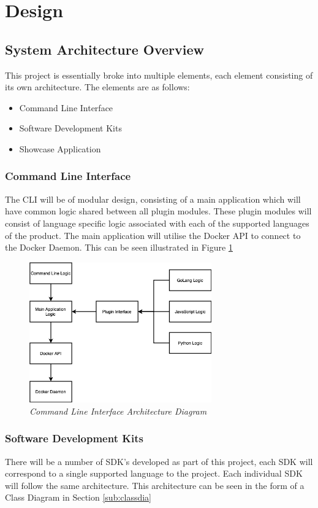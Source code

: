 \newpage
\section{Design}
\label{sub:design}

\subsection{System Architecture Overview}
This project is essentially broke into multiple elements, each element consisting of its own architecture. The elements are as follows:
\begin{itemize}
    \item Command Line Interface
    \item Software Development Kits
    \item Showcase Application
\end{itemize}

\subsubsection{Command Line Interface}
The CLI will be of modular design, consisting of a main application which will have common logic shared between all plugin modules. These plugin modules will consist of language specific logic associated with each of the supported languages of the product. The main application will utilise the Docker API to connect to the Docker Daemon. This can be seen illustrated in Figure \ref{img:cli-overview}

\begin{figure}[!ht]
\centering
\includegraphics*[width=0.7\textwidth]{images/cli-arch.png}
\caption{\em Command Line Interface Architecture Diagram}
\label{img:cli-overview}
\end{figure}

\subsubsection{Software Development Kits}
\label{sub:sdks}
There will be a number of SDK's developed as part of this project, each SDK will correspond to a single supported language to the project. Each individual SDK will follow the same architecture. This architecture can be seen in the form of a Class Diagram in Section \ref{sub:classdia}

